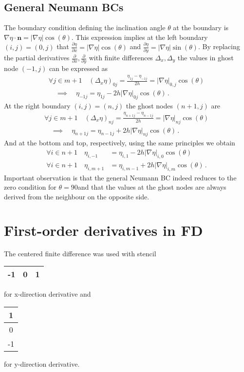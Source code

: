 \subsection*{General Neumann BCs}
The boundary condition defining the inclination angle $\theta$ at the boundary is $\nabla\eta\cdot\bm{n}=|\nabla\eta|\cos(\theta)$. This expression implies at the left boundary $(i,j)=(0,j)$  that $\frac{\partial \eta}{\partial x}=|\nabla\eta|\cos(\theta)$ and $\frac{\partial \eta}{\partial y}=|\nabla\eta|\sin(\theta)$. By replacing the partial derivatives $\frac{\partial}{\partial x},\frac{\partial}{\partial y}$ with finite differences $\Delta_x, \Delta_y$ the values in ghost node $(-1,j)$ can be expressed as 
\begin{align}
	\forall j\in m+1 \quad (\Delta_x \eta)_{0j} = \frac{\eta_{1j}-\eta_{-1j}}{2h} = |\nabla\eta|_{0,j}\cos(\theta) \\
		\quad\implies\quad \eta_{-1j}=\eta_{1j} - 2h|\nabla\eta|_{0j}\cos(\theta) \,.
\end{align}
At the right boundary $(i,j)=(n,j)$ the ghost nodes $(n+1,j)$ are
\begin{align}
	\forall j\in m+1 \quad (\Delta_x \eta)_{nj} = \frac{\eta_{n+1j}-\eta_{n-1j}}{2h} = |\nabla\eta|_{nj}\cos(\theta) \\
		\quad \implies\quad \eta_{n+1j}=\eta_{n-1j} + 2h|\nabla\eta|_{nj}\cos(\theta) \,.
\end{align}
And at the bottom and top, respectively, using the same principles we obtain
\begin{align}
	\forall i\in n+1 \quad  \eta_{i,-1}&=\eta_{i,1} - 2h|\nabla\eta|_{i,0}\cos(\theta) \\
	\forall i\in n+1 \quad  \eta_{i,m+1}&=\eta_{i,m-1} + 2h|\nabla\eta|_{i,m}\cos(\theta) 
	\,.
\end{align}
Important observation is that the general Neumann BC indeed reduces to the zero condition for $\theta=90$\textdegree and that the values at the ghost nodes are always derived from the neighbour on the opposite side. 

\section*{First-order derivatives in FD}
The centered finite difference was used with stencil  \begin{tabular}{|c|c|c|}
	\hline -1&0&1  \\\hline
\end{tabular} 
for x-direction derivative and
\begin{tabular}{|c|}
	\hline1  \\\hline
	0 \\\hline
	-1 \\\hline
\end{tabular} 
for y-direction derivative. 
